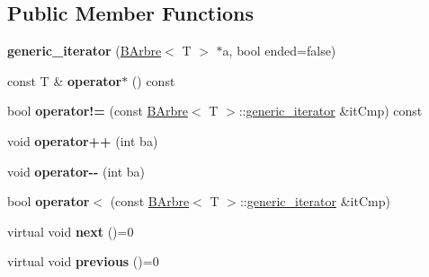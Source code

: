 \subsection*{Public Member Functions}
\begin{DoxyCompactItemize}
\item 
\hypertarget{classBArbre_1_1generic__iterator_abea43f33130b541d4c713c6bb56a5618}{
{\bfseries generic\_\-iterator} (\hyperlink{classBArbre}{BArbre}$<$ T $>$ $\ast$a, bool ended=false)}
\label{classBArbre_1_1generic__iterator_abea43f33130b541d4c713c6bb56a5618}

\item 
\hypertarget{classBArbre_1_1generic__iterator_aa3e1024170c9dfd01f22c6c89e862fe0}{
const T \& {\bfseries operator$\ast$} () const }
\label{classBArbre_1_1generic__iterator_aa3e1024170c9dfd01f22c6c89e862fe0}

\item 
\hypertarget{classBArbre_1_1generic__iterator_a290bda0be491b32f597c97d45836fc71}{
bool {\bfseries operator!=} (const \hyperlink{classBArbre}{BArbre}$<$ T $>$::\hyperlink{classBArbre_1_1generic__iterator}{generic\_\-iterator} \&itCmp) const }
\label{classBArbre_1_1generic__iterator_a290bda0be491b32f597c97d45836fc71}

\item 
\hypertarget{classBArbre_1_1generic__iterator_af2cc8115fa807f68d2a26d5693f15192}{
void {\bfseries operator++} (int ba)}
\label{classBArbre_1_1generic__iterator_af2cc8115fa807f68d2a26d5693f15192}

\item 
\hypertarget{classBArbre_1_1generic__iterator_acd1321a0f0d3ef360fd4df583b73eabc}{
void {\bfseries operator-\/-\/} (int ba)}
\label{classBArbre_1_1generic__iterator_acd1321a0f0d3ef360fd4df583b73eabc}

\item 
\hypertarget{classBArbre_1_1generic__iterator_a41ddc93c8700ac2de8b2e582df1472e5}{
bool {\bfseries operator$<$} (const \hyperlink{classBArbre}{BArbre}$<$ T $>$::\hyperlink{classBArbre_1_1generic__iterator}{generic\_\-iterator} \&itCmp)}
\label{classBArbre_1_1generic__iterator_a41ddc93c8700ac2de8b2e582df1472e5}

\item 
\hypertarget{classBArbre_1_1generic__iterator_ab3fd77d303ebb9ecefb73705662a2334}{
virtual void {\bfseries next} ()=0}
\label{classBArbre_1_1generic__iterator_ab3fd77d303ebb9ecefb73705662a2334}

\item 
\hypertarget{classBArbre_1_1generic__iterator_a1553fe665f6aac5217bc9b7fc2d5646f}{
virtual void {\bfseries previous} ()=0}
\label{classBArbre_1_1generic__iterator_a1553fe665f6aac5217bc9b7fc2d5646f}


\end{DoxyCompactItemize}
